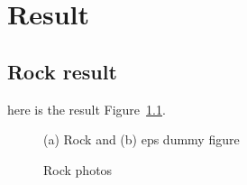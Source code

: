 %
%
\chapter{Result}
\hskip 0.5in

\section{Rock result}

here is the result Figure~\ref{result:Rock}. 

  \begin{figure}[h!]
    \hfill
    \caption{Rock photos}
		{(a) Rock and (b) eps dummy figure}
    \label{result:Rock}
  \end{figure} 
